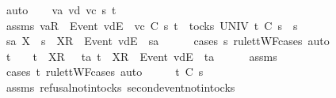 \ auto\isanewline
{}\isamarkupfalse%
\isanewline
\ \ \isamarkupfalse%
\ va\ vd\ vc\ s{}{\isacharprime}\ t\isanewline
\ \ \isamarkupfalse%
\ assms{\isacharcolon}\ {\isachardoublequoteopen}{\isacharbrackleft}va{\isacharbrackright}\isactrlsub R\ {\isacharhash}\ {\isacharbrackleft}Event\ vd{\isacharbrackright}\isactrlsub E\ {\isacharhash}\ vc\ {\isasymsubseteq}\isactrlsub C\ s{}{\isacharprime}{\isachardoublequoteclose}\ {\isachardoublequoteopen}t\ {\isasymin}\ tocks\ UNIV{\isachardoublequoteclose}\ {\isachardoublequoteopen}t\ {\isasymle}\isactrlsub C\ s{}{\isacharprime}\ {\isacharat}\ s{}{\isachardoublequoteclose}\isanewline
\ \ \isamarkupfalse%
\ \isamarkupfalse%
\ s{}{\isacharprime}a\ X\ \ {\isachardoublequoteopen}s{}{\isacharprime}\ {\isacharequal}\ {\isacharbrackleft}X{\isacharbrackright}\isactrlsub R\ {\isacharhash}\ {\isacharbrackleft}Event\ vd{\isacharbrackright}\isactrlsub E\ {\isacharhash}\ s{}{\isacharprime}a{\isachardoublequoteclose}\isanewline
\ \ \ \ \isamarkupfalse%
\ {\isacharparenleft}cases\ s{}{\isacharprime}\ rule{\isacharcolon}ttWF{\isachardot}cases{\isacharcomma}\ auto{\isacharparenright}\isanewline
\ \ \isamarkupfalse%
\ \isamarkupfalse%
\ {\isachardoublequoteopen}t\ {\isacharequal}\ {\isacharbrackleft}{\isacharbrackright}\ {\isasymor}\ t\ {\isacharequal}\ {\isacharbrackleft}{\isacharbrackleft}X{\isacharbrackright}\isactrlsub R{\isacharbrackright}\ {\isasymor}\ {\isacharparenleft}{\isasymexists}\ ta{\isachardot}\ t\ {\isacharequal}\ {\isacharbrackleft}X{\isacharbrackright}\isactrlsub R\ {\isacharhash}\ {\isacharbrackleft}Event\ vd{\isacharbrackright}\isactrlsub E\ {\isacharhash}\ ta{\isacharparenright}{\isachardoublequoteclose}\isanewline
\ \ \ \ \isamarkupfalse%
\ assms{\isacharparenleft}{}{\isacharparenright}\ \isamarkupfalse%
\ {\isacharparenleft}cases\ t\ rule{\isacharcolon}ttWF{\isachardot}cases{\isacharcomma}\ auto{\isacharparenright}\isanewline
\ \ \isamarkupfalse%
\ \isamarkupfalse%
\ {\isachardoublequoteopen}t\ {\isasymle}\isactrlsub C\ s{}{\isacharprime}{\isachardoublequoteclose}\isanewline
\ \ \ \ \isamarkupfalse%
\ assms{\isacharparenleft}{}{\isacharparenright}\ refusal{\isacharunderscore}notin{\isacharunderscore}tocks\ second{\isacharunderscore}event{\isacharunderscore}notin{\isacharunderscore}tocks\ \isamarkupfalse%
